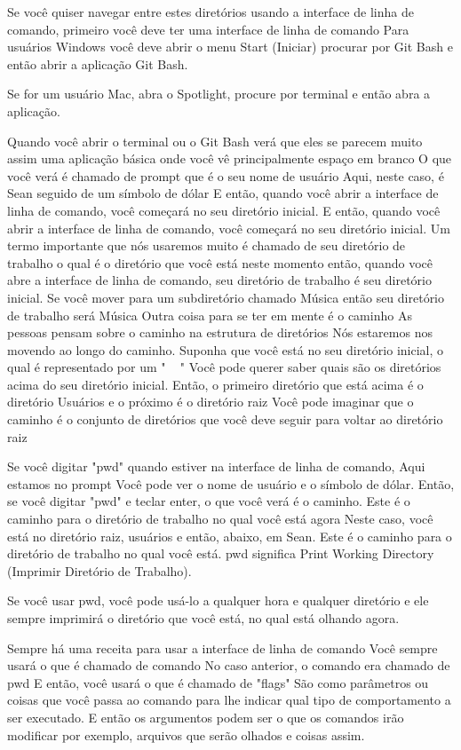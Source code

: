 Se você quiser navegar entre estes diretórios usando a interface de linha de comando, primeiro você deve ter uma interface de linha de comando Para usuários Windows você deve abrir o menu Start (Iniciar) procurar por Git Bash e então abrir a aplicação Git Bash. 

Se for um usuário Mac, abra o Spotlight, procure por terminal e então abra a aplicação. 

Quando você abrir o terminal ou o Git Bash verá que eles se parecem muito assim uma aplicação básica onde você vê principalmente espaço em branco O que você verá é chamado de prompt que é o seu nome de usuário Aqui, neste caso, é Sean seguido de um símbolo de dólar E então, quando você abrir a interface de linha de comando, você começará no seu diretório inicial. E então, quando você abrir a interface de linha de comando, você começará no seu diretório inicial. Um termo importante que nós usaremos muito é chamado de seu diretório de trabalho o qual é o diretório que você está neste momento então, quando você abre a interface de linha de comando, seu diretório de trabalho é seu diretório inicial. Se você mover para um subdiretório chamado Música então seu diretório de trabalho será Música Outra coisa para se ter em mente é o caminho As pessoas pensam sobre o caminho na estrutura de diretórios Nós estaremos nos movendo ao longo do caminho. Suponha que você está no seu diretório inicial, o qual é representado por um " ~ " Você pode querer saber quais são  os diretórios acima do seu diretório inicial. Então, o primeiro diretório que está acima é o diretório Usuários e o próximo é o diretório raiz Você pode imaginar que o caminho é o conjunto de diretórios  que você deve seguir para voltar ao diretório raiz 

Se você digitar "pwd" quando estiver na interface de linha de comando, Aqui estamos no prompt Você pode ver o nome de usuário e o símbolo de dólar. Então, se você digitar "pwd" e teclar enter, o que você verá é o caminho. Este é o caminho para o diretório de trabalho no qual você está agora Neste caso, você está no diretório raiz, usuários e então, abaixo, em Sean. Este é o caminho para o diretório de trabalho no qual você está. pwd significa Print Working Directory (Imprimir Diretório de Trabalho). 

Se você usar pwd, você pode usá-lo a qualquer hora e qualquer diretório e ele sempre imprimirá o diretório que você está, no qual está olhando agora. 

Sempre há uma receita para usar a interface de linha de comando Você sempre usará o que é chamado de comando No caso anterior, o comando era chamado de pwd E então, você usará o que é chamado de "flags" São como parâmetros ou coisas que você passa ao comando para lhe indicar qual tipo de comportamento a ser executado. E então os argumentos podem ser o que os comandos irão modificar por exemplo, arquivos que serão olhados e coisas assim. 

